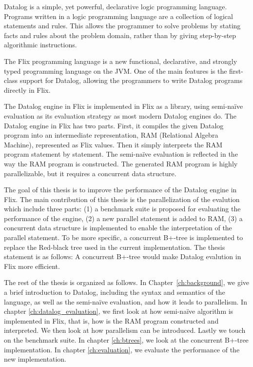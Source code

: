 \documentclass[twoside,11pt,openright]{report}
\theoremstyle{definition}
\newcommand{\todo}[1]{{\color[rgb]{.5,0,0}\textbf{$\blacktriangleright$#1$\blacktriangleleft$}}}
\begin{document}


Datalog is a simple, yet powerful, declarative logic programming language.
Programs written in a logic programming language are a
collection of logical statements and rules. This allows the programmer to
solve problems by stating facts and rules about the problem domain,
rather than by giving step-by-step algorithmic instructions.

The Flix programming language is a new functional, declarative,
and strongly typed programming language on the JVM.
One of the main features is the first-class support for Datalog,
allowing the programmers to write Datalog programs directly in Flix.

The Datalog engine in Flix is implemented in Flix as a library,
using semi-na\"ive evaluation as its evaluation strategy
as most modern Datalog engines do. The Datalog engine in Flix has two parts.
First, it compiles the given Datalog program into an intermediate representation,
RAM (Relational Algebra Machine), represented as Flix values. Then it simply
interprets the RAM program statement by statement. The semi-na\"ive evaluation
is reflected in the way the RAM program is constructed. The generated RAM program is highly
parallelizable, but it requires a concurrent data structure.

The goal of this thesis is to improve the performance of the
Datalog engine in Flix. The main contribution of this thesis is the parallelization
of the evalution which include three parts: (1) a benchmark suite is proposed for
evaluating the performance of the engine, (2) a new parallel statement is added to
RAM, (3) a concurrent data structure is implemented to enable the interpretation of
the parallel statement. To be more specific, a concurrent B+-tree is implemented
to replace the Red-black tree used in the current implementation. The thesis statement
is as follows: A concurrent B+-tree would make Datalog evalution in Flix more efficient.

The rest of the thesis is organized as follows. In Chapter~\ref{ch:background},
we give a brief introduction to Datalog, including the syntax and semantics of the language,
as well as the semi-na\"ive evaluation, and how it leads to parallelism.
In chapter \ref{ch:datalog_evaluation}, we first look at how semi-na\"ive algorithm is
implemented in Flix, that is, how is the RAM program constructed and interpreted.
We then look at how parallelism can be introduced. Lastly we touch on the benchmark suite.
In chapter \ref{ch:btrees}, we look at the concurrent B+-tree implementation. In chapter
\ref{ch:evaluation}, we evaluate the performance of the new implementation.
\end{document}
